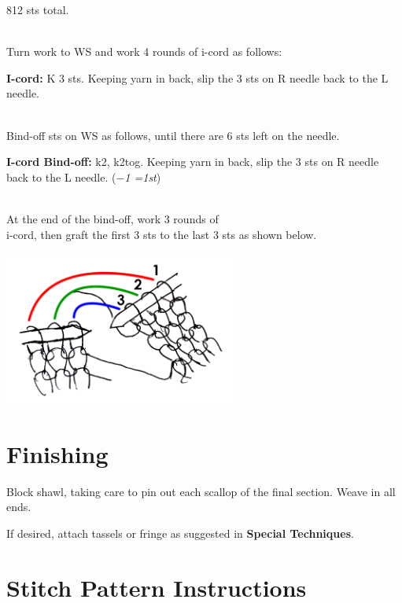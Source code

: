 \documentclass[12pt]{article}
\newcommand{\rowDir}[1]{\textbf{#1:}} %
\newcommand{\decrease}[1]{(\emph{$-$#1
	\ifnum#1=1{st}\else{sts}\fi})}
\begin{document}
\begin{multicols}{2}
812 sts total.


~\\
Turn work to WS and work 4 rounds of i-cord as follows:

\rowDir{I-cord} K 3 sts. Keeping yarn in back, slip the 3 sts on R needle back to the L needle.

~\\
Bind-off sts on WS as follows, until there are 6 sts left on the needle.

\rowDir{I-cord Bind-off} k2, k2tog. Keeping yarn in back, slip the 3 sts on R needle back to the L needle. \decrease{1}

~\\
At the end of the bind-off, work 3 rounds of \\ i-cord, then graft the first 3 sts to the last 3 sts as shown below.

\vspace{-1em}
\begin{center}
\includegraphics[height=2in]{kitchener.png}
\end{center}

\vspace{-3em}
\section*{Finishing}

Block shawl, taking care to pin out each scallop of the final section. Weave in all ends.

If desired, attach tassels or fringe as suggested in \textbf{Special Techniques}.


\vfill
\end{multicols}

\newpage
\section*{Stitch Pattern Instructions}
\end{document}
